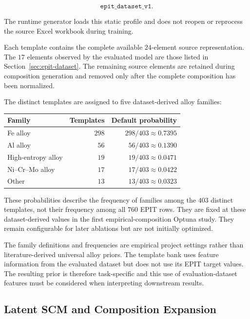 \documentclass{article}
\begin{document}
\[
\texttt{epit\_dataset\_v1}.
\]

The runtime generator loads this static profile and does not reopen or reprocess
the source Excel workbook during training.

Each template contains the complete available \(24\)-element source
representation. The \(17\) elements observed by the evaluated model are those
listed in Section~\ref{sec:epit-dataset}. The remaining source elements are
retained during composition generation and removed only after the complete
composition has been normalized.

The distinct templates are assigned to five dataset-derived alloy families:

\begin{center}
\small
\begin{tabular}{lrr}
\hline
\textbf{Family} & \textbf{Templates} & \textbf{Default probability} \\
\hline
Fe alloy & \(298\) & \(298/403 \approx 0.7395\) \\
Al alloy & \(56\) & \(56/403 \approx 0.1390\) \\
High-entropy alloy & \(19\) & \(19/403 \approx 0.0471\) \\
Ni--Cr--Mo alloy & \(17\) & \(17/403 \approx 0.0422\) \\
Other & \(13\) & \(13/403 \approx 0.0323\) \\
\hline
\end{tabular}
\end{center}

These probabilities describe the frequency of families among the \(403\)
distinct templates, not their frequency among all \(760\) EPIT rows. They are
fixed at these dataset-derived values in the first empirical-composition Optuna
study. They remain configurable for later ablations but are not initially
optimized.

The family definitions and frequencies are empirical project settings rather
than literature-derived universal alloy priors. The template bank uses feature
information from the evaluated dataset but does not use its EPIT target values.
The resulting prior is therefore task-specific and this use of evaluation-dataset
features must be considered when interpreting downstream results.

\subsection{Latent SCM and Composition Expansion}
\end{document}
